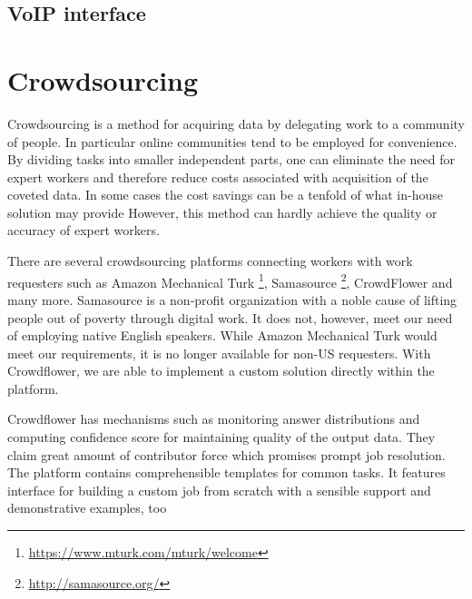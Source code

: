 \subsection{VoIP interface}







\section{Crowdsourcing}

Crowdsourcing is a method for acquiring data by delegating work to a community of people.
In particular online communities tend to be employed for convenience.
By dividing tasks into smaller independent parts, one can eliminate the need for expert workers and therefore reduce costs associated with acquisition of the coveted data.
In some cases the cost savings can be a tenfold of what in-house solution may provide \cite{Quality Management on Amazon Mechanical Turk} %
However, this method can hardly achieve the quality or accuracy of expert workers. 

There are several crowdsourcing platforms connecting workers with work requesters such as Amazon Mechanical Turk \footnote{\url{https://www.mturk.com/mturk/welcome}}, Samasource \footnote{\url{http://samasource.org/}}, CrowdFlower and many more.
Samasource is a non-profit organization with a noble cause of lifting people out of poverty through digital work.
It does not, however, meet our need of employing native English speakers.
While Amazon Mechanical Turk would meet our requirements, it is no longer available for non-US requesters.
With Crowdflower, we are able to implement a custom solution directly within the platform.

Crowdflower has mechanisms such as monitoring answer distributions and computing confidence score for maintaining quality of the output data. %
They claim great amount of contributor force which promises prompt job resolution. %
The platform contains comprehensible templates for common tasks.
It features interface for building a custom job from scratch with a sensible support and demonstrative examples, too %
